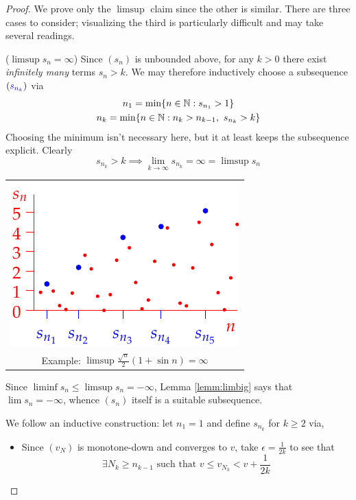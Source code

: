\begin{proof}
	We prove only the $\limsup$ claim since the other is similar. There are three cases to consider; visualizing the third is particularly difficult and may take several readings.
	\begin{description}
	  \begin{minipage}[t]{0.56\linewidth}\vspace{-10pt}
		  \item[\normalfont ($\limsup s_n=\infty$)]\lstsp Since $(s_n)$ is unbounded above, for any $k>0$ there exist \emph{infinitely many} terms $s_n>k$. We may therefore inductively choose a subsequence $(\textcolor{blue}{s_{n_k}})$ via
		  \begin{gather*}
		  	n_1=\min\{n\in\mathbb{N}:s_{n_1}>1\}\\
		  	n_k=\min\{n\in\mathbb{N}:n_k>n_{k-1},\ s_{n_k}>k\}
		  \end{gather*}
		  Choosing the minimum isn't necessary here, but it at least keeps the subsequence explicit. Clearly
			\[s_{n_k}>k\implies \lim_{k\to\infty} s_{n_k}=\infty=\limsup s_n\]
	  \end{minipage}
	 	\hfill
	 	\begin{minipage}[t]{0.4\linewidth}\vspace{-10pt}
		  \hfill
		  \begin{tabular}{c@{}}
		  	\includegraphics{dominant3}\\
		  	Example: $\limsup \frac{\sqrt n}2(1+\sin n)=\infty$
		  \end{tabular}
	  \end{minipage}
	  
		\item[\normalfont ($\limsup s_n=-\infty$)]\lstsp Since $\liminf s_n\le \limsup s_n=-\infty$, Lemma \ref{lemm:limbig} says that $\lim s_n=-\infty$, whence $(s_n)$ itself is a suitable subsequence.
		
	  \item[\normalfont ($\limsup s_n=v$ finite)]\lstsp We follow an inductive construction: let $n_1=1$ and define $s_{n_k}$ for $k\ge 2$ via,
		\begin{itemize}
		  \item Since $(v_N)$ is monotone-down and converges to $v$, take $\epsilon=\frac 1{2k}$ to see that\footnotemark{}
		  \[\exists N_k\ge n_{k-1}\text{ such that }v\le v_{N_k}<v+\frac 1{2k}\]
	

\end{itemize}
\end{description}
\end{proof}

